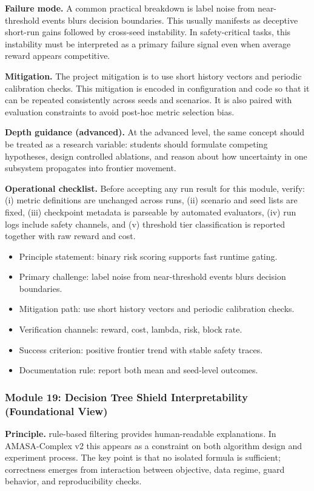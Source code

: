 \documentclass[conference]{IEEEtran}
\begin{document}
\textbf{Failure mode.} A common practical breakdown is label noise from near-threshold events blurs decision boundaries. This usually manifests as deceptive short-run gains followed by cross-seed instability. In safety-critical tasks, this instability must be interpreted as a primary failure signal even when average reward appears competitive.

\textbf{Mitigation.} The project mitigation is to use short history vectors and periodic calibration checks. This mitigation is encoded in configuration and code so that it can be repeated consistently across seeds and scenarios. It is also paired with evaluation constraints to avoid post-hoc metric selection bias.

\textbf{Depth guidance (advanced).} At the advanced level, the same concept should be treated as a research variable: students should formulate competing hypotheses, design controlled ablations, and reason about how uncertainty in one subsystem propagates into frontier movement.

\textbf{Operational checklist.} Before accepting any run result for this module, verify: (i) metric definitions are unchanged across runs, (ii) scenario and seed lists are fixed, (iii) checkpoint metadata is parseable by automated evaluators, (iv) run logs include safety channels, and (v) threshold tier classification is reported together with raw reward and cost.

\begin{itemize}[leftmargin=*]
  \item Principle statement: binary risk scoring supports fast runtime gating.
  \item Primary challenge: label noise from near-threshold events blurs decision boundaries.
  \item Mitigation path: use short history vectors and periodic calibration checks.
  \item Verification channels: reward, cost, lambda, risk, block rate.
  \item Success criterion: positive frontier trend with stable safety traces.
  \item Documentation rule: report both mean and seed-level outcomes.
\end{itemize}


\subsubsection{Module 19: Decision Tree Shield Interpretability (Foundational View)}
\textbf{Principle.} rule-based filtering provides human-readable explanations. In AMASA-Complex v2 this appears as a constraint on both algorithm design and experiment process. The key point is that no isolated formula is sufficient; correctness emerges from interaction between objective, data regime, guard behavior, and reproducibility checks.
\end{document}
